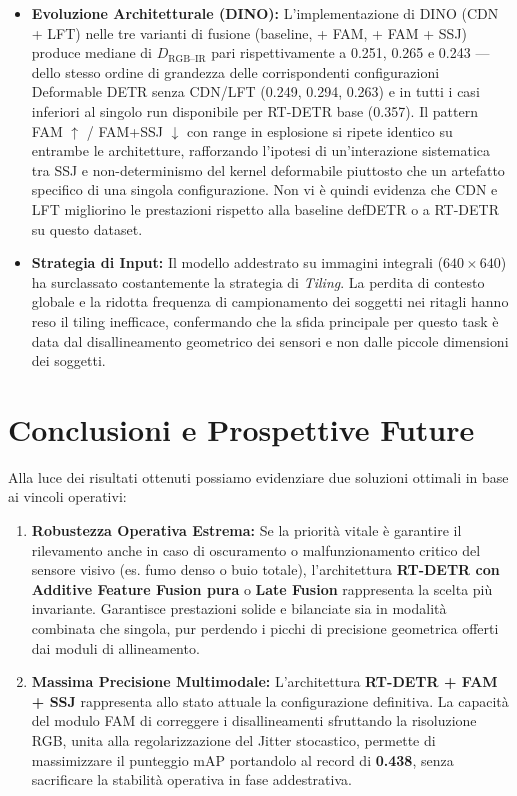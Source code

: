 \documentclass[a4paper,11pt]{article}
\begin{document}
\begin{itemize}
    \item \textbf{Evoluzione Architetturale (DINO):}
    L'implementazione di DINO (CDN + LFT) nelle tre varianti di fusione (baseline, + FAM, + FAM + SSJ) produce mediane di $D_{\text{RGB--IR}}$ pari rispettivamente a 0.251, 0.265 e 0.243 — dello stesso ordine di grandezza delle corrispondenti configurazioni Deformable DETR senza CDN/LFT (0.249, 0.294, 0.263) e in tutti i casi inferiori al singolo run disponibile per RT-DETR base (0.357). Il pattern FAM $\uparrow$ / FAM+SSJ $\downarrow$ con range in esplosione si ripete identico su entrambe le architetture, rafforzando l'ipotesi di un'interazione sistematica tra SSJ e non-determinismo del kernel deformabile piuttosto che un artefatto specifico di una singola configurazione. Non vi è quindi evidenza che CDN e LFT migliorino le prestazioni rispetto alla baseline defDETR o a RT-DETR su questo dataset.
    
    \item \textbf{Strategia di Input:}
    Il modello addestrato su immagini integrali ($640\times640$) ha surclassato costantemente la strategia di \textit{Tiling}. La perdita di contesto globale e la ridotta frequenza di campionamento dei soggetti nei ritagli hanno reso il tiling inefficace, confermando che la sfida principale per questo task è data dal disallineamento geometrico dei sensori e non dalle piccole dimensioni dei soggetti.
\end{itemize}

\section*{Conclusioni e Prospettive Future}

Alla luce dei risultati ottenuti possiamo evidenziare due soluzioni ottimali in base ai vincoli operativi:

\begin{enumerate}
    \item \textbf{Robustezza Operativa Estrema:} Se la priorità vitale è garantire il rilevamento anche in caso di oscuramento o malfunzionamento critico del sensore visivo (es. fumo denso o buio totale), l'architettura \textbf{RT-DETR con Additive Feature Fusion pura} o \textbf{Late Fusion} rappresenta la scelta più invariante. Garantisce prestazioni solide e bilanciate sia in modalità combinata che singola, pur perdendo i picchi di precisione geometrica offerti dai moduli di allineamento.

    \item \textbf{Massima Precisione Multimodale:} L'architettura \textbf{RT-DETR + FAM + SSJ} rappresenta allo stato attuale la configurazione definitiva. La capacità del modulo FAM di correggere i disallineamenti sfruttando la risoluzione RGB, unita alla regolarizzazione del Jitter stocastico, permette di massimizzare il punteggio mAP portandolo al record di \textbf{0.438}, senza sacrificare la stabilità operativa in fase addestrativa.
\end{enumerate}
\end{document}
